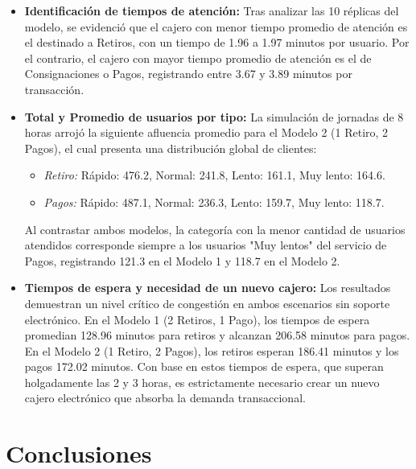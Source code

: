 \documentclass[12pt, a4paper]{article}
\begin{document}
\begin{itemize}
    \item \textbf{Identificación de tiempos de atención:} Tras analizar las 10 réplicas del modelo, se evidenció que el cajero con menor tiempo promedio de atención es el destinado a Retiros, con un tiempo de 1.96 a 1.97 minutos por usuario. Por el contrario, el cajero con mayor tiempo promedio de atención es el de Consignaciones o Pagos, registrando entre 3.67 y 3.89 minutos por transacción.
    
    \item \textbf{Total y Promedio de usuarios por tipo:} La simulación de jornadas de 8 horas arrojó la siguiente afluencia promedio para el Modelo 2 (1 Retiro, 2 Pagos), el cual presenta una distribución global de clientes:
    \begin{itemize}
        \item \textit{Retiro:} Rápido: 476.2, Normal: 241.8, Lento: 161.1, Muy lento: 164.6.
        \item \textit{Pagos:} Rápido: 487.1, Normal: 236.3, Lento: 159.7, Muy lento: 118.7.
    \end{itemize}
    Al contrastar ambos modelos, la categoría con la menor cantidad de usuarios atendidos corresponde siempre a los usuarios "Muy lentos" del servicio de Pagos, registrando 121.3 en el Modelo 1 y 118.7 en el Modelo 2.
    
    \item \textbf{Tiempos de espera y necesidad de un nuevo cajero:} Los resultados demuestran un nivel crítico de congestión en ambos escenarios sin soporte electrónico. En el Modelo 1 (2 Retiros, 1 Pago), los tiempos de espera promedian 128.96 minutos para retiros y alcanzan 206.58 minutos para pagos. En el Modelo 2 (1 Retiro, 2 Pagos), los retiros esperan 186.41 minutos y los pagos 172.02 minutos. Con base en estos tiempos de espera, que superan holgadamente las 2 y 3 horas, es estrictamente necesario crear un nuevo cajero electrónico que absorba la demanda transaccional.
\end{itemize}

\section{Conclusiones}
\end{document}
